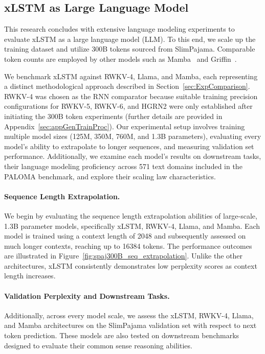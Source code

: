 \subsection{xLSTM as Large Language Model}
\label{sec:ExpLanguage}

This research concludes with extensive language modeling experiments to evaluate xLSTM as a large language model (LLM). To this end, we scale up the training dataset and utilize 300B tokens sourced from SlimPajama. Comparable token counts are employed by other models such as Mamba~\citep{Gu:24arxiv} and Griffin~\citep{De:24arxiv}.

We benchmark xLSTM against RWKV-4, Llama, and Mamba, each representing a distinct methodological approach described in Section~\ref{sec:ExpComparison}. RWKV-4 was chosen as the RNN comparator because suitable training precision configurations for RWKV-5, RWKV-6, and HGRN2 were only established after initiating the 300B token experiments (further details are provided in Appendix~\ref{sec:appGenTrainProc}). Our experimental setup involves training multiple model sizes (125M, 350M, 760M, and 1.3B parameters), evaluating every model's ability to extrapolate to longer sequences, and measuring validation set performance. Additionally, we examine each model's results on downstream tasks, their language modeling proficiency across 571 text domains included in the PALOMA benchmark, and explore their scaling law characteristics.

\paragraph{Sequence Length Extrapolation.}
\label{sec:spaj300B_ctx_extrapolation}
We begin by evaluating the sequence length extrapolation abilities of large-scale, 1.3B parameter models, specifically xLSTM, RWKV-4, Llama, and Mamba. Each model is trained using a context length of 2048 and subsequently assessed on much longer contexts, reaching up to 16384 tokens. The performance outcomes are illustrated in Figure~\ref{fig:spaj300B_seq_extrapolation}. Unlike the other architectures, xLSTM consistently demonstrates low perplexity scores as context length increases.

\paragraph{Validation Perplexity and Downstream Tasks.}
\label{sec:spaj_downstream_eval}
Additionally, across every model scale, we assess the xLSTM, RWKV-4, Llama, and Mamba architectures on the SlimPajama validation set with respect to next token prediction. These models are also tested on downstream benchmarks designed to evaluate their common sense reasoning abilities.

